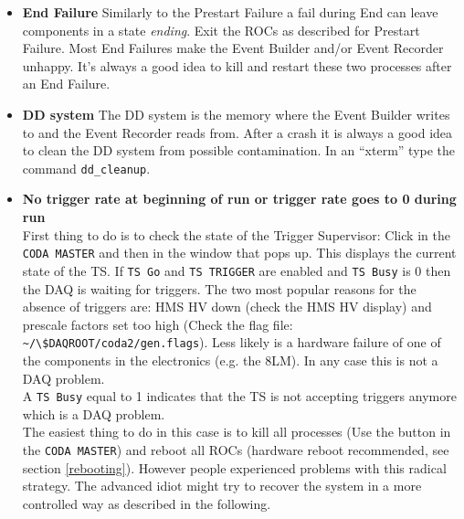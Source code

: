 \begin{itemize}
\item{\bf End Failure} Similarly to the Prestart Failure a fail during End 
can leave components in a state {\em ending}. Exit the ROCs as
described for Prestart Failure. 
Most End Failures make the Event Builder and/or 
Event Recorder unhappy. It's always a good idea to kill and restart 
these two processes after an End Failure.

\item{\bf DD system} The DD system is the memory where the 
Event Builder writes to and the Event Recorder reads from. After a crash 
it is always a good idea to clean the DD system from possible contamination.
In an ``xterm'' type the command \verb|dd_cleanup|. 

\item {\bf No trigger rate at beginning of run or trigger rate goes to 0 
during run}\\
First thing to do is to check the state of the Trigger Supervisor: Click 
 in the \verb|CODA MASTER| and then  in the 
window that pops up. This displays the current state of the TS. If 
\verb|TS Go| and \verb|TS TRIGGER| are enabled and \verb|TS Busy| is 0
then the DAQ is waiting for triggers. 
The two most popular reasons for the absence of triggers are: 
HMS HV down (check the HMS HV display) and prescale 
factors set too high (Check the flag file: \verb|~/\$DAQROOT/coda2/gen.flags|).
Less likely is a hardware failure of one of the components in the electronics
(e.g. the 8LM). In any case this is not a DAQ problem.\\
A \verb|TS Busy| equal to 1 indicates that the TS is not accepting 
triggers anymore which is a DAQ problem.\\
The easiest 
thing to do in this case is to kill all processes (Use the  
button in the \verb|CODA MASTER|)  and reboot all ROCs 
(hardware reboot recommended, see section \ref{rebooting}). However people 
experienced problems with this radical strategy. The advanced idiot 
might try to recover the system in a more controlled way as described in the
following.\\


\end{itemize}
